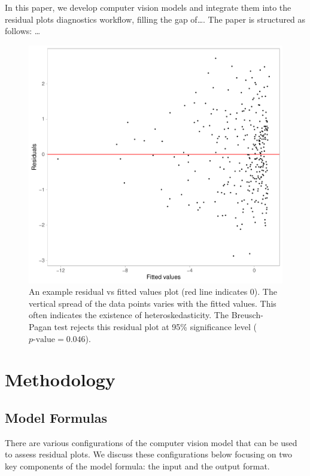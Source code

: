 \documentclass[]{interact}
\theoremstyle{plain}%
\theoremstyle{definition}
\theoremstyle{remark}
\begin{document}
In this paper, we develop computer vision models and integrate them into
the residual plots diagnostics workflow, filling the gap of\ldots. The
paper is structured as follows: \ldots{}

\begin{figure}[!h]

{\centering \includegraphics[width=1\linewidth]{paper_files/figure-latex/false-finding-1} 

}

\caption{An example residual vs fitted values plot (red line indicates 0). The vertical spread of the data points varies with the fitted values. This often indicates the existence of heteroskedasticity. The Breusch-Pagan test rejects this residual plot at 95\% significance level ($p\text{-value} = 0.046$).}\label{fig:false-finding}
\end{figure}

\section{Methodology}\label{methodology}

\subsection{Model Formulas}\label{model-formulas}

There are various configurations of the computer vision model that can
be used to assess residual plots. We discuss these configurations below
focusing on two key components of the model formula: the input and the
output format.
\end{document}

